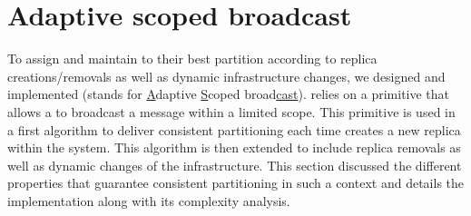 


\section{Adaptive scoped broadcast}
\label{sec:adaptive}




To assign and maintain \processes to their best partition according to
replica creations/removals as well as dynamic infrastructure changes,
we designed and implemented \NAME (\NAME stands for
\underline{A}daptive \underline{S}coped broad\underline{cast}).  \NAME
relies on a primitive that allows a \process to broadcast a message
within a limited scope.  This primitive is used in a first algorithm
to deliver consistent partitioning each time \process creates a new
replica within the system. This algorithm is then extended to include
replica removals as well as dynamic changes of the infrastructure.
This section discussed the different properties that guarantee
consistent partitioning in such a context and details the \NAME
implementation along with its complexity analysis.


